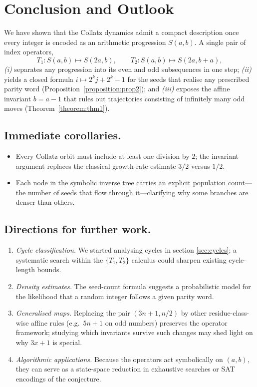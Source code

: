 \documentclass{article}
\theoremstyle{definition}
\begin{document}
\section{Conclusion and Outlook}\label{sec:conclusion}

We have shown that the Collatz dynamics admit a compact
description once every integer is encoded as an arithmetic progression
\(S(a,b)\).  A single pair of index operators,
\[
  T_{1}:S(a,b)\longmapsto S(2a,b),
  \qquad
  T_{2}:S(a,b)\longmapsto S(2a,b+a),
\]
\emph{(i)} separates any progression into its even and odd
subsequences in one step; \emph{(ii)} yields a closed formula
\(i\mapsto 2^{k}j+2^{k}-1\) for the seeds that realise any prescribed
parity word (Proposition~\ref{proposition:prop2}); and \emph{(iii)} exposes the
affine invariant \(b=a-1\) that rules out trajectories consisting of
infinitely many odd moves (Theorem~\ref{theorem:thm1}).

\subsection{Immediate corollaries.}
\begin{itemize}
  \item Every Collatz orbit must include at least one division by \(2\); the
        invariant argument replaces the classical growth-rate estimate
        \(3/2\) versus \(1/2\).
  \item Each node in the symbolic inverse tree carries an explicit
        population count—the number of seeds that flow through
        it—clarifying why some branches are denser than others.
\end{itemize}

\medskip
\noindent
\subsection{Directions for further work.}
\begin{enumerate}
  \item \emph{Cycle classification.}  
        We started analysing cycles in section \ref{sec:cycles}; a systematic search within the
        \(\{T_{1},T_{2}\}\) calculus could sharpen existing cycle-length
        bounds.
  \item \emph{Density estimates.}  
        The seed-count formula suggests a probabilistic model for the
        likelihood that a random integer follows a given parity word.
  \item \emph{Generalised maps.}  
        Replacing the pair \((3n+1,n/2)\) by other residue-class-wise
        affine rules (e.g.\ \(5n+1\) on odd numbers) preserves the
        operator framework; studying which invariants survive such
        changes may shed light on why \(3x+1\) is special.
  \item \emph{Algorithmic applications.}  
        Because the operators act symbolically on \((a,b)\), they can
        serve as a state-space reduction in exhaustive searches or SAT
        encodings of the conjecture.
\end{enumerate}

\end{document}
